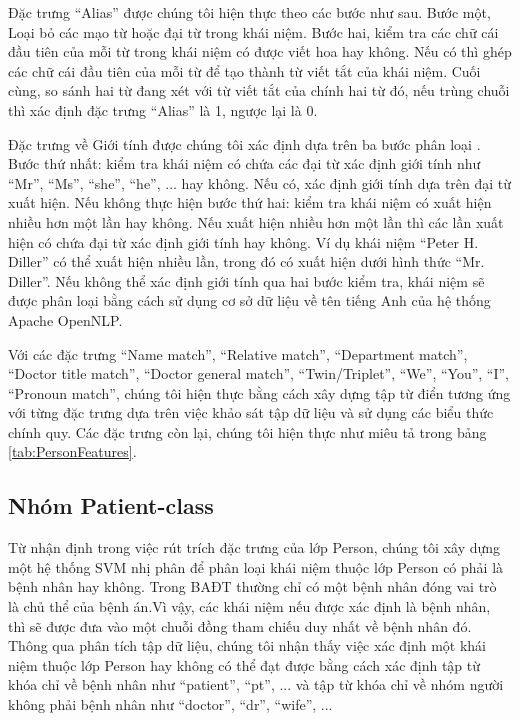 Đặc trưng ``Alias'' được chúng tôi hiện thực theo các bước như sau. Bước một, Loại bỏ các mạo từ hoặc đại từ trong khái niệm. Bước hai, kiểm tra các chữ cái đầu tiên của mỗi từ trong khái niệm có được viết hoa hay không. Nếu có thì ghép các chữ cái đầu tiên của mỗi từ để tạo thành từ viết tắt của khái niệm. Cuối cùng, so sánh hai từ đang xét với từ viết tắt của chính hai từ đó, nếu trùng chuỗi thì xác định đặc trưng ``Alias'' là 1, ngược lại là 0.

Đặc trưng về Giới tính được chúng tôi xác định dựa trên ba bước phân loại \cite{WeeSoon2001}. Bước thứ nhất: kiểm tra khái niệm có chứa các đại từ xác định giới tính như ``Mr'', ``Ms'', ``she'', ``he'', ... hay không. Nếu có, xác định giới tính dựa trên đại từ xuất hiện. Nếu không thực hiện bước thứ hai: kiểm tra khái niệm có xuất hiện nhiều hơn một lần hay không. Nếu xuất hiện nhiều hơn một lần thì các lần xuất hiện có chứa đại từ xác định giới tính hay không. Ví dụ khái niệm ``Peter H. Diller'' có thể xuất hiện nhiều lần, trong đó có xuất hiện dưới hình thức ``Mr. Diller''. Nếu không thể xác định giới tính qua hai bước kiểm tra, khái niệm sẽ được phân loại bằng cách sử dụng cơ sở dữ liệu về tên tiếng Anh của hệ thống Apache OpenNLP.

Với các đặc trưng ``Name match'', ``Relative match'', ``Department match'', ``Doctor title match'', ``Doctor general match'', ``Twin/Triplet'', ``We'', ``You'', ``I'', ``Pronoun match'', chúng tôi hiện thực bằng cách xây dựng tập từ điển tương ứng với từng đặc trưng dựa trên việc khảo sát tập dữ liệu và sử dụng các biểu thức chính quy. Các đặc trưng còn lại, chúng tôi hiện thực như miêu tả trong bảng \ref{tab:PersonFeatures}.

\subsection*{Nhóm Patient-class}
Từ nhận định trong việc rút trích đặc trưng của lớp Person, chúng tôi xây dựng một hệ thống SVM nhị phân để phân loại khái niệm thuộc lớp Person có phải là bệnh nhân hay không. Trong BAĐT thường chỉ có một bệnh nhân đóng vai trò là chủ thể của bệnh án.Vì vậy, các khái niệm nếu được xác định là bệnh nhân, thì sẽ được đưa vào một chuỗi đồng tham chiếu duy nhất về bệnh nhân đó. Thông qua phân tích tập dữ liệu, chúng tôi nhận thấy việc xác định một khái niệm thuộc lớp Person hay không có thể đạt được bằng cách xác định tập từ khóa chỉ về bệnh nhân như ``patient'', ``pt'', ... và tập từ khóa chỉ về nhóm người không phải bệnh nhân như ``doctor'', ``dr'', ``wife'', ...

